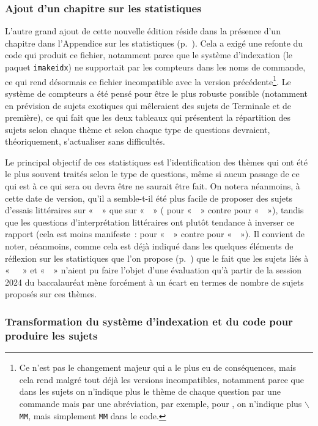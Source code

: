 \subsubsection{Ajout d'un chapitre sur les statistiques}

L'autre grand ajout de cette nouvelle édition réside dans la présence d'un chapitre dans l'Appendice sur les statistiques (p.~\pageref{statistiques}). Cela a exigé une refonte du code qui produit ce fichier, notamment parce que le système d'indexation (le paquet \texttt{imakeidx}) ne supportait par les compteurs dans les noms de commande, ce qui rend désormais ce fichier incompatible avec la version précédente\footnote{Ce n'est pas le changement majeur qui a le plus eu de conséquences, mais cela rend malgré tout déjà les versions incompatibles, notamment parce que dans les sujets on n'indique plus le thème de chaque question par une commande mais par une abréviation, par exemple, pour \MM{}, on n'indique plus \texttt{$\backslash$MM}, mais simplement \texttt{MM} dans le code.}. Le système de compteurs a été pensé pour être le plus robuste possible (notamment en prévision de sujets exotiques qui mêleraient des sujets de Terminale et de première), ce qui fait que les deux tableaux qui présentent la répartition des sujets selon chaque thème et selon chaque type de questions devraient, théoriquement, s'actualiser sans difficultés.

Le principal objectif de ces statistiques est l'identification des thèmes qui ont été le plus souvent traités selon le type de questions, même si aucun passage de ce qui est à ce qui sera ou devra être ne saurait être fait. On notera néanmoins, à cette date de version, qu'il a semble-t-il été plus facile de proposer des sujets d'essais littéraires sur «~\MM{}~» que sur «~\EXS{}~» ( pour «~\MM{}~» contre  pour «~\EXS~»), tandis que les questions d'interprétation littéraires ont plutôt tendance à inverser ce rapport (cela est moins manifeste~:  pour «~\MM{}~» contre  pour «~\EXS{}~»). Il convient de noter, néanmoins, comme cela est déjà indiqué dans les quelques éléments de réflexion sur les statistiques que l'on propose (p.~\pageref{statistiques}) que le fait que les sujets liés à «~\ETA~~» et «~\CC~» n'aient pu faire l'objet d'une évaluation qu'à partir de la session 2024 du baccalauréat mène forcément à un écart en termes de nombre de sujets proposés sur ces thèmes.

\subsubsection{Transformation du système d'indexation et du code pour produire les sujets}

